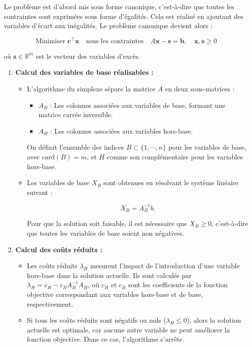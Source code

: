 \documentclass[12pt]{article}
\begin{document}
Le problème est d'abord mis sous forme canonique, c'est-à-dire que toutes 
les contraintes sont exprimées sous forme d'égalités. Cela est 
réalisé en ajoutant des variables d'écart aux inégalités. 
Le problème canonique devient alors :

\[
\text{Minimiser } \mathbf{c}^\top \mathbf{x} \quad \text{sous les contraintes} \quad A\mathbf{x} - \mathbf{s} = \mathbf{b}, \quad \mathbf{x}, \mathbf{s} \geq 0
\]

où \(\mathbf{s} \in \mathbb{R}^m\) est le vecteur des variables d'excès.



\begin{enumerate}
    \item \textbf{Calcul des variables de base réalisables :} 
    \begin{itemize}
        \item L'algorithme du simplexe sépare la matrice \( A \) en deux sous-matrices :
        \begin{itemize}
            \item \( A_B \) : Les colonnes associées aux variables de base, formant une matrice carrée inversible.
            \item \( A_H \) : Les colonnes associées aux variables hors-base.
        \end{itemize}
        
        On définit l'ensemble des indices \( B \subset \{1, \cdots, n\} \) pour les variables de base, avec \( \text{card}(B) = m \), et \( H \) comme son complémentaire pour les variables hors-base.
    
        \item Les variables de base \( X_B \) sont obtenues en résolvant le système linéaire suivant :
        
        \[
        X_B = A_B^{-1}b.
        \]
        
        Pour que la solution soit faisable, il est nécessaire que \( X_B \geq 0 \), c'est-à-dire que toutes les variables de base soient non négatives.
    \end{itemize}


    \item \textbf{Calcul des coûts réduits :} 
    \begin{itemize}
        \item Les coûts réduits \(\lambda_H\) mesurent l'impact de l'introduction d'une variable hors-base dans la solution actuelle. Ils sont calculés par \( \lambda_H = c_H - c_B A_B^{-1} A_H \), où \( c_H \) et \( c_B \) sont les coefficients de la fonction objective correspondant aux variables hors-base et de base, respectivement.
        \item Si tous les coûts réduits sont négatifs ou nuls (\( \lambda_H \leq 0 \)), alors la solution actuelle est optimale, car aucune autre variable ne peut améliorer la fonction objective. Dans ce cas, l'algorithme s'arrête.
    \end{itemize}


\end{enumerate}
\end{document}
